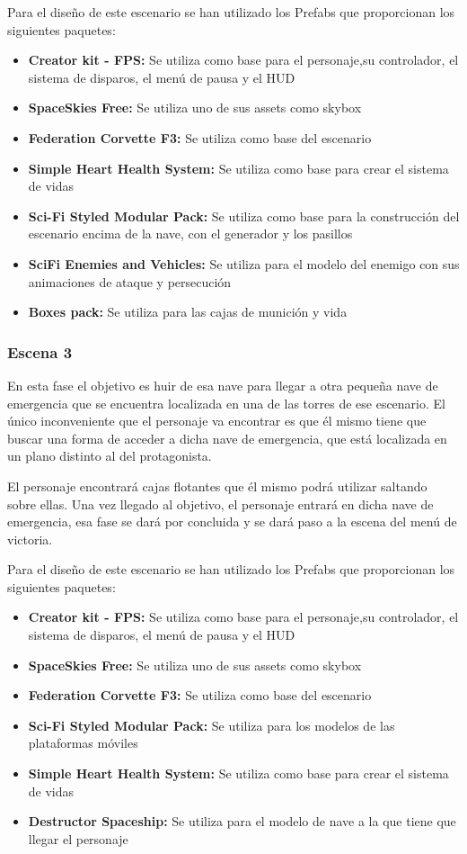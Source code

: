 Para el diseño de este escenario se han utilizado los Prefabs que proporcionan los siguientes paquetes:
\begin{itemize}
	\item \textbf{Creator kit - FPS:} Se utiliza como base para el personaje,su controlador, el sistema de disparos, el menú de pausa y el HUD
	\item \textbf{SpaceSkies Free:} Se utiliza uno de sus assets como skybox
	\item \textbf{Federation Corvette F3:} Se utiliza como base del escenario
	\item \textbf{Simple Heart Health System:} Se utiliza como base para crear el sistema de vidas
	\item \textbf{Sci-Fi Styled Modular Pack:} Se utiliza como base para la construcción del escenario encima de la nave, con el generador y los pasillos
	\item \textbf{SciFi Enemies and Vehicles:} Se utiliza para el modelo del enemigo con sus animaciones de ataque y persecución
	\item \textbf{Boxes pack:} Se utiliza para las cajas de munición y vida
\end{itemize}


\subsubsection{Escena 3}
En esta fase el objetivo es huir de esa nave para llegar a otra pequeña nave de emergencia que se encuentra localizada en una de las torres de ese escenario. El único inconveniente que el personaje va encontrar es que él mismo tiene que buscar una forma de acceder a dicha nave de emergencia, que está localizada en un plano distinto al del protagonista.

El personaje encontrará cajas flotantes que él mismo podrá utilizar saltando sobre ellas. Una vez llegado al objetivo, el personaje entrará en dicha nave de emergencia, esa fase se dará por concluida y se dará paso a la escena del menú de victoria.

Para el diseño de este escenario se han utilizado los Prefabs que proporcionan los siguientes paquetes:
\begin{itemize}
	\item \textbf{Creator kit - FPS:} Se utiliza como base para el personaje,su controlador, el sistema de disparos, el menú de pausa y el HUD
	\item \textbf{SpaceSkies Free:} Se utiliza uno de sus assets como skybox
	\item \textbf{Federation Corvette F3:} Se utiliza como base del escenario
	\item \textbf{Sci-Fi Styled Modular Pack:} Se utiliza para los modelos de las plataformas móviles
	\item \textbf{Simple Heart Health System:} Se utiliza como base para crear el sistema de vidas
	\item \textbf{Destructor Spaceship:} Se utiliza para el modelo de nave a la que tiene que llegar el personaje
\end{itemize}


